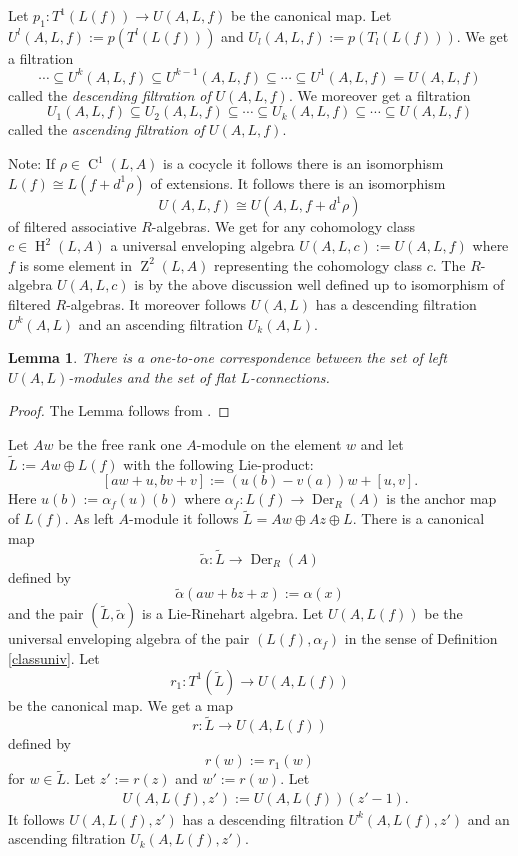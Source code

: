 \documentclass{amsart}
\theoremstyle{plain}
\newtheorem{lemma}[theorem]{Lemma}
\theoremstyle{definition}
\theoremstyle{remark}
\numberwithin{equation}{theorem}
\begin{document}
Let $p_1:T^1(L(f))\rightarrow U({A},L,f)$ be the canonical map. Let $U^l({A},L,f):=p(T^l(L(f)))$ and $U_l({A},L,f):=p(T_l(L(f)))$.
We get a filtration
\[  \cdots \subseteq U^k({A},L,f) \subseteq U^{k-1}({A},L,f) \subseteq \cdots \subseteq U^1({A},L,f)=U({A},L,f) \]
called the \emph{descending filtration of} $U({A},L,f)$.
We moreover get a filtration
\[ U_1({A},L,f) \subseteq U_2({A},L,f) \subseteq \cdots \subseteq U_k({A},L,f) \subseteq \cdots \subseteq U({A},L,f) \]
called the \emph{ascending filtration of} $U({A},L,f)$.

Note: If $\rho \in {\operatorname{C} }^1(L,{A})$ is a cocycle it follows there is an isomorphism $L(f)\cong L(f+d^1\rho)$
of extensions. It follows there is an isomorphism
\[ U({A},L,f)\cong U({A},L,f+d^1\rho) \]
of filtered associative ${R}$-algebras. We get for any cohomology class $ c\in {\operatorname{H} }^2(L,{A})$ a universal enveloping algebra
$U({A},L,c):=U({A},L,f)$ where $f$ is some element in ${\operatorname{Z}}^2(L,{A})$ representing the cohomology
class $c$. The ${R}$-algebra $U({A},L,c)$ is by the above discussion well defined up to isomorphism of filtered ${R}$-algebras.
It moreover follows $U({A},L)$ has a descending filtration $U^k({A},L)$ and an ascending filtration $U_k({A},L)$.

\begin{lemma} 
There is a one-to-one correspondence between the set of left $U({A},L)$-modules and the set of flat $L$-connections.
\end{lemma}
\begin{proof} The Lemma follows from \cite{rinehart}.
\end{proof}

Let ${A} w$ be the free rank one ${A}$-module on the element $w$ and 
let $\tilde{L}:={A} w\oplus L(f)$ with the following Lie-product:
\[ [aw+u, bv+v]:= (u(b)-v(a))w+[u,v].\]
Here $u(b):=\alpha_f(u)(b)$ where $\alpha_f:L(f)\rightarrow {\operatorname{Der} }_{R}({A})$ is the anchor map of $L(f)$.
As left ${A}$-module it follows $\tilde{L}={A} w\oplus {A} z\oplus L$.
There is a canonical map
\[ \tilde{\alpha}:\tilde{L}\rightarrow {\operatorname{Der} }_{R}({A}) \]
defined by
\[ \tilde{\alpha}(aw+bz+x):=\alpha(x)\]
and the pair $(\tilde{L},\tilde{\alpha})$ is a Lie-Rinehart algebra.
Let $U({A}, L(f))$ be the universal enveloping algebra of the pair $(L(f), \alpha_f)$ in the sense of Definition 
\ref{classuniv}.
Let
\[ r_1:T^1(\tilde{L})\rightarrow U({A},L(f)) \]
be the canonical map.
We get a map
\[ r:\tilde{L}\rightarrow U({A},L(f)) \]
defined by
\[ r(w):=r_1(w)\]
for $w\in \tilde{L}$. Let $z':=r(z)$ and $w':=r(w)$.
Let 
\begin{align}
&\label{univz} U({A},L(f), z'):=U({A},L(f))(z'-1) .
\end{align}
It follows $U({A},L(f),z')$ has a descending filtration 
$U^k({A},L(f),z')$ and an ascending filtration $U_k({A},L(f),z')$.
\end{document}
